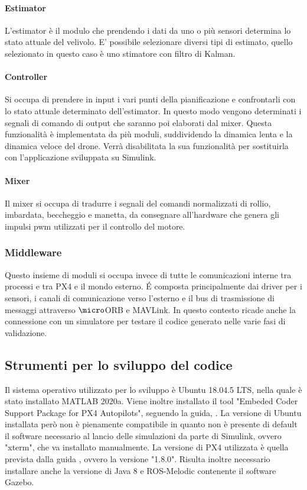 \paragraph{Estimator}
L'estimator è il modulo che prendendo i dati da uno o più sensori determina lo stato attuale del velivolo. E' possibile selezionare diversi tipi di estimato, quello selezionato in questo caso è uno stimatore con filtro di Kalman.
\paragraph{Controller}
Si occupa di prendere in input i vari punti della pianificazione e confrontarli con lo stato attuale determinato dell'estimator. In questo modo vengono determinati i segnali di comando di output che saranno poi elaborati dal mixer. Questa funzionalità è implementata da più moduli, suddividendo la dinamica lenta e la dinamica veloce del drone. Verrà disabilitata la sua funzionalità per sostituirla con l'applicazione sviluppata su Simulink.
\paragraph{Mixer}
Il mixer si occupa di tradurre i segnali del comandi normalizzati di rollio, imbardata, beccheggio e manetta, da consegnare all'hardware che genera gli impulsi pwm utilizzati per il controllo del motore.
\subsubsection{Middleware}
Questo insieme di moduli si occupa invece di tutte le comunicazioni interne tra processi e tra PX4 e il mondo esterno. \'E composta principalmente dai driver per i sensori, i canali di comunicazione verso l'esterno e il bus di trasmissione di messaggi attraverso $\micro$ORB e MAVLink. In questo contesto ricade anche  la connessione con un simulatore per testare il codice generato nelle varie fasi di validazione.
\subsection{Strumenti per lo sviluppo del codice}
Il sistema operativo utilizzato per lo sviluppo è Ubuntu 18.04.5 LTS, nella quale è stato installato MATLAB 2020a. Viene inoltre installato il tool "Embeded Coder Support Package for PX4 Autopilots", seguendo la guida, \cite{PX4MATLAB}. La versione di Ubuntu  installata però non è pienamente compatibile in quanto non è presente di default il software necessario al lancio delle simulazioni da parte di Simulink, ovvero "xterm", che va installato manualmente. La versione di PX4 utilizzata è quella prevista dalla guida \cite{PX4MATLAB}, ovvero la versione "1.8.0". Risulta inoltre necessario installare anche la versione di Java 8 e ROS-Melodic contenente il software Gazebo.

